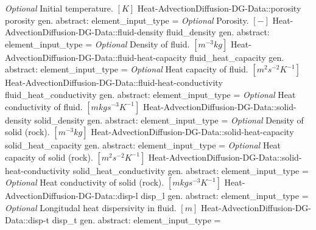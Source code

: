 \begin{RecordType}
			{ \it{Optional}}
			{{{Initial temperature. }{$[K]$}%
}}
		\RecKey
			{Heat-AdvectionDiffusion-DG-Data::porosity}
			{porosity}
			{{gen. abstract: }}{{element{\_}input{\_}type}{ = }}
			{ \it{Optional}}
			{{{Porosity. }{$[-]$}%
}}
		\RecKey
			{Heat-AdvectionDiffusion-DG-Data::fluid-density}
			{fluid{\_}density}
			{{gen. abstract: }}{{element{\_}input{\_}type}{ = }}
			{ \it{Optional}}
			{{{Density of fluid. }{$[m^{-3}kg]$}%
}}
		\RecKey
			{Heat-AdvectionDiffusion-DG-Data::fluid-heat-capacity}
			{fluid{\_}heat{\_}capacity}
			{{gen. abstract: }}{{element{\_}input{\_}type}{ = }}
			{ \it{Optional}}
			{{{Heat capacity of fluid. }{$[m^{2}s^{-2}K^{-1}]$}%
}}
		\RecKey
			{Heat-AdvectionDiffusion-DG-Data::fluid-heat-conductivity}
			{fluid{\_}heat{\_}conductivity}
			{{gen. abstract: }}{{element{\_}input{\_}type}{ = }}
			{ \it{Optional}}
			{{{Heat conductivity of fluid. }{$[mkgs^{-3}K^{-1}]$}%
}}
		\RecKey
			{Heat-AdvectionDiffusion-DG-Data::solid-density}
			{solid{\_}density}
			{{gen. abstract: }}{{element{\_}input{\_}type}{ = }}
			{ \it{Optional}}
			{{{Density of solid (rock). }{$[m^{-3}kg]$}%
}}
		\RecKey
			{Heat-AdvectionDiffusion-DG-Data::solid-heat-capacity}
			{solid{\_}heat{\_}capacity}
			{{gen. abstract: }}{{element{\_}input{\_}type}{ = }}
			{ \it{Optional}}
			{{{Heat capacity of solid (rock). }{$[m^{2}s^{-2}K^{-1}]$}%
}}
		\RecKey
			{Heat-AdvectionDiffusion-DG-Data::solid-heat-conductivity}
			{solid{\_}heat{\_}conductivity}
			{{gen. abstract: }}{{element{\_}input{\_}type}{ = }}
			{ \it{Optional}}
			{{{Heat conductivity of solid (rock). }{$[mkgs^{-3}K^{-1}]$}%
}}
		\RecKey
			{Heat-AdvectionDiffusion-DG-Data::disp-l}
			{disp{\_}l}
			{{gen. abstract: }}{{element{\_}input{\_}type}{ = }}
			{ \it{Optional}}
			{{{Longitudal heat dispersivity in fluid. }{$[m]$}%
}}
		\RecKey
			{Heat-AdvectionDiffusion-DG-Data::disp-t}
			{disp{\_}t}
			{{gen. abstract: }}{{element{\_}input{\_}type}{ = }}

\end{RecordType}
